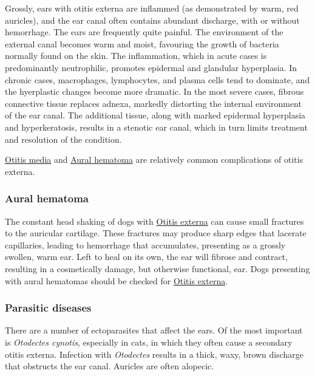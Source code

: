 \documentclass[openany]{article}
\begin{document}
Grossly, ears with otitis externa are inflammed (as demonstrated by
warm, red auricles), and the ear canal often contains abundant
discharge, with or without hemorrhage. The ears are frequently quite
painful. The environment of the external canal becomes warm and moist,
favouring the growth of bacteria normally found on the skin. The
inflammation, which in acute cases is predominantly neutrophilic,
promotes epidermal and glandular hyperplasia. In chronic cases,
macrophages, lymphocytes, and plasma cells tend to dominate, and the
hyerplastic changes become more dramatic. In the most severe cases,
fibrous connective tissue replaces adnexa, markedly distorting the
internal environment of the ear canal. The additional tissue, along with
marked epidermal hyperplasia and hyperkeratosis, results in a stenotic
ear canal, which in turn limits treatment and resolution of the
condition.

\protect\hyperlink{otitis-media}{Otitis media} and
\protect\hyperlink{aural-hematoma}{Aural hematoma} are relatively common
complications of otitis externa.

\hypertarget{aural-hematoma}{\subsubsection{Aural
hematoma}\label{aural-hematoma}}

The constant head shaking of dogs with
\protect\hyperlink{otitis-externa}{Otitis externa} can cause small
fractures to the auricular cartilage. These fractures may produce sharp
edges that lacerate capillaries, leading to hemorrhage that accumulates,
presenting as a grossly swollen, warm ear. Left to heal on its own, the
ear will fibrose and contract, resulting in a cosmetically damage, but
otherwise functional, ear. Dogs presenting with aural hematomas should
be checked for \protect\hyperlink{otitis-externa}{Otitis externa}.

\subsubsection{Parasitic diseases}\label{parasitic-diseases}

There are a number of ectoparasites that affect the ears. Of the most
important is \emph{Otodectes cynotis}, especially in cats, in which they
often cause a secondary otitis externa. Infection with \emph{Otodectes}
results in a thick, waxy, brown discharge that obstructs the ear canal.
Auricles are often alopecic.
\end{document}
